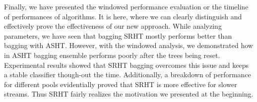 Finally, we have presented the windowed performance evaluation or the timeline of performances of algorithms. It is here, where we can clearly distinguish and effectively prove the effectiveness of our new approach. While analyzing parameters, we have seen that bagging SRHT mostly performs better than bagging with ASHT. However, with the windowed analysis, we demonstrated how in ASHT bagging ensemble performs poorly after the trees being reset. Experimental results showed that SRHT bagging overcomes this issue and keeps a stable classifier though-out the time. Additionally, a breakdown of performance for different pools evidentially proved that SRHT is more effective for slower streams. Thus SRHT fairly realizes the motivation we presented at the beginning.
